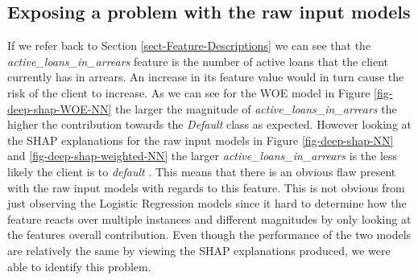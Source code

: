 \subsection{Exposing a problem with the raw input models} \label{sect-problem-expose}
If we refer back to Section \ref{sect-Feature-Descriptions} we can see that  the \emph{active\_loans\_in\_arrears} feature is the number of active loans that the client currently has in arrears. An increase in its feature value would in turn cause the risk of the client to increase. As we can see for the WOE model in Figure \ref{fig-deep-shap-WOE-NN} the larger the magnitude of \emph{active\_loans\_in\_arrears} the higher the contribution towards the \emph{Default} class as expected. However looking at the SHAP explanations for the raw input models in Figure \ref{fig-deep-shap-NN} and \ref{fig-deep-shap-weighted-NN} the larger  \emph{active\_loans\_in\_arrears} is the less likely the client is to \emph{default} . This means that there is an obvious flaw present with the raw input models with regards to this feature. This is not obvious from just observing the Logistic Regression models since it hard to determine how the feature reacts over multiple instances and different magnitudes by only looking at the features overall contribution. Even though the performance of the two models are relatively the same by viewing the SHAP explanations produced, we were able to identify this problem.

